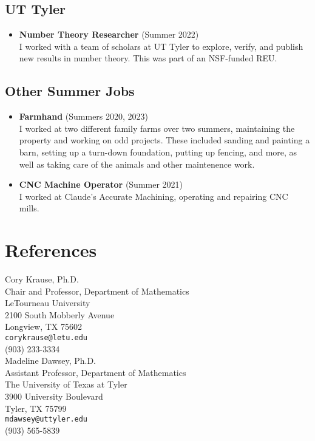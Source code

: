 \documentclass[a4paper, 11pt]{article}
\begin{document}
    \subsection*{UT Tyler}
    \begin{itemize}
        \item \textbf{Number Theory Researcher} (Summer 2022) \\
        I worked with a team of scholars at UT Tyler to explore, verify, and publish new results in number theory.
        This was part of an NSF-funded REU.
    \end{itemize}
    \subsection*{Other Summer Jobs}
    \begin{itemize}
        \item \textbf{Farmhand} (Summers 2020, 2023) \\
        I worked at two different family farms over two summers, maintaining the property and working on odd projects.
        These included sanding and painting a barn, setting up a turn-down foundation, putting up fencing, and more,
        as well as taking care of the animals and other maintenence work.
        \item \textbf{CNC Machine Operator} (Summer 2021) \\
        I worked at Claude's Accurate Machining, operating and repairing CNC mills.
    \end{itemize}

    \section*{References}\label{sec:references}
    \noindent
    Cory Krause, Ph.D. \\
    Chair and Professor, Department of Mathematics \\
    LeTourneau University \\
    2100 South Mobberly Avenue \\
    Longview, TX 75602 \\
    \texttt{corykrause@letu.edu} \\
    (903) 233-3334 \\

    \noindent
    Madeline Dawsey, Ph.D. \\
    Assistant Professor, Department of Mathematics \\
    The University of Texas at Tyler \\
    3900 University Boulevard \\
    Tyler, TX 75799 \\
    \texttt{mdawsey@uttyler.edu} \\
    (903) 565-5839 \\
\end{document}
